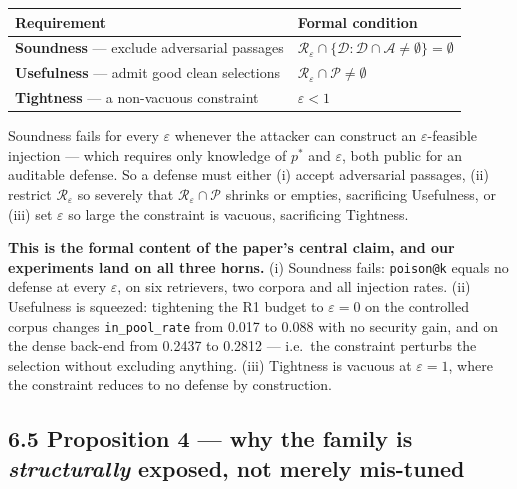 \documentclass[authoryear,review,3p,times]{elsarticle}
\newcounter{none}
\begin{document}
{\def\LTcaptype{none} %
\begin{longtable}[]{@{}
  >{\raggedright\arraybackslash}p{}
  >{\raggedright\arraybackslash}p{}@{}}
\toprule\noalign{}
\begin{minipage}[b]{\linewidth}\raggedright
Requirement
\end{minipage} & \begin{minipage}[b]{\linewidth}\raggedright
Formal condition
\end{minipage} \\
\midrule\noalign{}

\bottomrule\noalign{}

\textbf{Soundness} --- exclude adversarial passages & \(\mathcal{R}_\varepsilon \cap \{\mathcal{D} : \mathcal{D}\cap\mathcal{A} \neq \emptyset\} = \emptyset\) \\
\textbf{Usefulness} --- admit good clean selections & \(\mathcal{R}_\varepsilon \cap \mathcal{P} \neq \emptyset\) \\
\textbf{Tightness} --- a non-vacuous constraint & \(\varepsilon < 1\) \\
\end{longtable}
}

Soundness fails for every \(\varepsilon\) whenever the attacker can construct an \(\varepsilon\)-feasible injection --- which requires only knowledge of \(p^{*}\) and \(\varepsilon\), both public for an auditable defense. So a defense must either (i) accept adversarial passages, (ii) restrict \(\mathcal{R}_\varepsilon\) so severely that \(\mathcal{R}_\varepsilon \cap \mathcal{P}\) shrinks or empties, sacrificing Usefulness, or (iii) set \(\varepsilon\) so large the constraint is vacuous, sacrificing Tightness.

\textbf{This is the formal content of the paper's central claim, and our experiments land on all three horns.} (i) Soundness fails: \texttt{poison@k} equals no defense at every \(\varepsilon\), on six retrievers, two corpora and all injection rates. (ii) Usefulness is squeezed: tightening the R1 budget to \(\varepsilon=0\) on the controlled corpus changes \texttt{in\_pool\_rate} from 0.017 to 0.088 with no security gain, and on the dense back-end from 0.2437 to 0.2812 --- i.e.~the constraint perturbs the selection without excluding anything. (iii) Tightness is vacuous at \(\varepsilon = 1\), where the constraint reduces to no defense by construction.

\subsection{\texorpdfstring{6.5 Proposition 4 --- why the family is \emph{structurally} exposed, not merely mis-tuned}{6.5 Proposition 4 --- why the family is structurally exposed, not merely mis-tuned}}\label{proposition-4-why-the-family-is-structurally-exposed-not-merely-mis-tuned}
\end{document}
